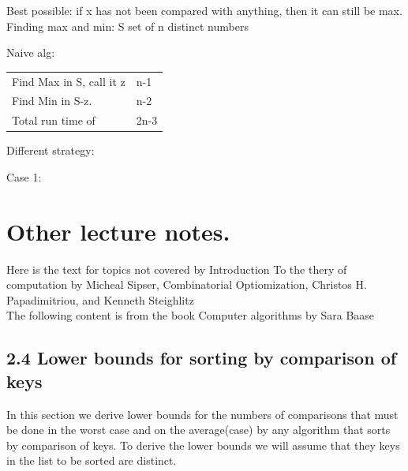 \documentclass[a4paper,10pt,titlepage]{report}
\begin{document}
Best possible: if x has not been compared with anything, then it can still be max.\\

Finding max and min: S set of n distinct numbers\\
\vspace{5mm}

Naive alg:\\
\begin{tabular}{ll}
Find Max in S, call it z & n-1\\
Find Min in S-z. & n-2\\
Total run time of & 2n-3
\end{tabular}

Different strategy:

Case 1:


\chapter{Other lecture notes.}
Here is the text for topics not covered by Introduction To the thery of computation by Micheal Sipser, Combinatorial Optiomization, Christos H. Papadimitriou, and Kenneth Steighlitz\\

The following content is from the book Computer algorithms by Sara Baase\\
\newpage
\section{2.4 Lower bounds for sorting by comparison of keys}
In this section we derive lower bounds for the numbers of comparisons that must be done in the worst case and on the average(case) by any algorithm that sorts by comparison of keys. To derive the lower bounds we will assume that they keys in the list to be sorted are distinct.
\end{document}
